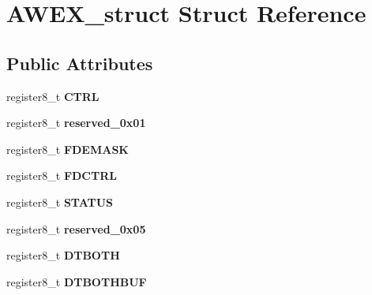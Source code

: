 \hypertarget{struct_a_w_e_x__struct}{}\section{A\+W\+E\+X\+\_\+struct Struct Reference}
\label{struct_a_w_e_x__struct}
\subsection*{Public Attributes}
\begin{DoxyCompactItemize}
\item 
register8\+\_\+t {\bfseries C\+T\+RL}\hypertarget{struct_a_w_e_x__struct_aac954aa43ab948ad37adb7cf0be52057}{}\label{struct_a_w_e_x__struct_aac954aa43ab948ad37adb7cf0be52057}

\item 
register8\+\_\+t {\bfseries reserved\+\_\+0x01}\hypertarget{struct_a_w_e_x__struct_aa30b96a5ec2d96a93cb82aacfbd1340f}{}\label{struct_a_w_e_x__struct_aa30b96a5ec2d96a93cb82aacfbd1340f}

\item 
register8\+\_\+t {\bfseries F\+D\+E\+M\+A\+SK}\hypertarget{struct_a_w_e_x__struct_a9577b9adec4f18193f1be54b41091f8c}{}\label{struct_a_w_e_x__struct_a9577b9adec4f18193f1be54b41091f8c}

\item 
register8\+\_\+t {\bfseries F\+D\+C\+T\+RL}\hypertarget{struct_a_w_e_x__struct_a75f2ed02d61d96e36ae17d39c74d1c94}{}\label{struct_a_w_e_x__struct_a75f2ed02d61d96e36ae17d39c74d1c94}

\item 
register8\+\_\+t {\bfseries S\+T\+A\+T\+US}\hypertarget{struct_a_w_e_x__struct_acffb4313fe7461a88478648e4fa28242}{}\label{struct_a_w_e_x__struct_acffb4313fe7461a88478648e4fa28242}

\item 
register8\+\_\+t {\bfseries reserved\+\_\+0x05}\hypertarget{struct_a_w_e_x__struct_aef895e95ce97706f18e130dba875f58e}{}\label{struct_a_w_e_x__struct_aef895e95ce97706f18e130dba875f58e}

\item 
register8\+\_\+t {\bfseries D\+T\+B\+O\+TH}\hypertarget{struct_a_w_e_x__struct_ad5b03a3a361ce40ad64afe30787cf20d}{}\label{struct_a_w_e_x__struct_ad5b03a3a361ce40ad64afe30787cf20d}

\item 
register8\+\_\+t {\bfseries D\+T\+B\+O\+T\+H\+B\+UF}\hypertarget{struct_a_w_e_x__struct_aea8f66130481bddfe1d0d8768563ff8f}{}\label{struct_a_w_e_x__struct_aea8f66130481bddfe1d0d8768563ff8f}


\end{DoxyCompactItemize}

